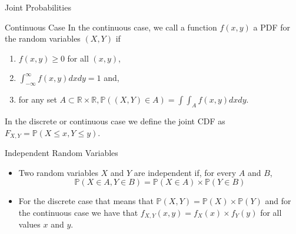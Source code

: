 \documentclass[handout]{beamer}
\begin{document}
\begin{frame}{Joint Probabilities}
\scriptsize{

\begin{block}{Continuous Case}
In the continuous case, we call a function $f(x,y)$ a PDF for the random variables $(X, Y)$ if
\begin{enumerate}
 \item $f(x, y) \geq 0$ for all $(x, y)$,
 \item $\int_{-\infty}^{\infty} f(x,y)dxdy=1$ and,
 \item for any set $A \subset \mathbb{R}\times\mathbb{R}, \mathbb{P}((X,Y) \in A)=\int \int_{A}f(x,y)dxdy$. 
\end{enumerate}

\end{block}

In the discrete or continuous case we define the joint CDF
as $F_{X,Y} = \mathbb{P}(X \leq x, Y \leq y)$.

\begin{block}{Independent Random Variables}
\begin{itemize}
 \item Two random variables $X$ and $Y$ are independent if, for every $A$ and $B$, 
 \begin{displaymath}
\mathbb{P}(X \in A, Y \in B)=\mathbb{P}(X \in A)\times \mathbb{P}(Y \in B)                                                     \end{displaymath}
\item For the discrete case that means that $\mathbb{P}(X, Y) =\mathbb{P}(X)\times \mathbb{P}(Y)$ and for the continuous case we have that $f_{X,Y}(x, y) = f_{X}(x)\times f_{Y}(y)$ for all values $x$ and $y$.

\end{itemize}



\end{block}



} 
\end{frame}
\end{document}
